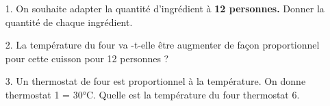 \begin{enumerate}
  \item[1.] On souhaite adapter la quantité d'ingrédient à \textbf{12 personnes.} Donner la quantité de chaque ingrédient. \\ \Pointilles[7] 
  \item[2.] La température du four va -t-elle être augmenter de façon proportionnel pour cette cuisson pour 12 personnes ?  \\ \Pointilles[2] 
  \item[3.] Un thermostat de four est proportionnel à la température. On donne thermostat 1 = 30°C. Quelle est la température du four thermostat 6. \\ \Pointilles[3] 
\end{enumerate}


